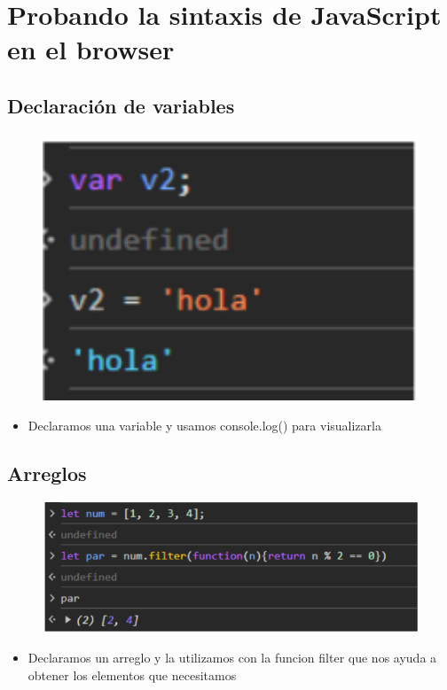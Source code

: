 \documentclass{article}
\begin{document}
\section{Probando la sintaxis de JavaScript en el browser}
	\subsection{Declaración de variables}
	\begin{figure}[H]
		\centering
		\includegraphics[width=1.0\textwidth,keepaspectratio]{img/DeclaracionVariables.PNG}
	\end{figure}
	\begin{itemize}
		\item Declaramos una variable y usamos console.log() para visualizarla
	\end{itemize}
	\subsection{Arreglos}
	\begin{figure}[H]
		\centering
		\includegraphics[width=1.0\textwidth,keepaspectratio]{img/Arreglos.PNG}
	\end{figure}
	\begin{itemize}
		\item Declaramos un arreglo y la utilizamos con la funcion filter que nos ayuda a obtener los elementos que necesitamos
	\end{itemize} 
\end{document}
